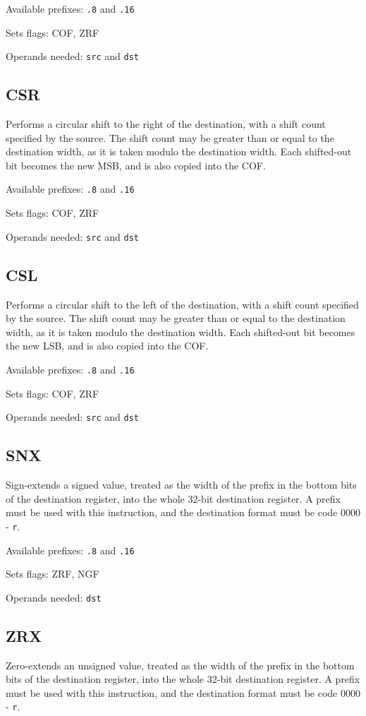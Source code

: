 \documentclass[12pt,a4paper]{report}
\begin{document}
Available prefixes: \texttt{.8} and \texttt{.16}

Sets flags: COF, ZRF

Operands needed: \texttt{src} and \texttt{dst}

\subsection*{CSR}
Performs a circular shift to the right of the destination, with a shift count specified by the source. The shift count may be greater than or equal to the destination width, as it is taken modulo the destination width. Each shifted-out bit becomes the new MSB, and is also copied into the COF.

Available prefixes: \texttt{.8} and \texttt{.16}

Sets flags: COF, ZRF

Operands needed: \texttt{src} and \texttt{dst}

\subsection*{CSL}
Performs a circular shift to the left of the destination, with a shift count specified by the source. The shift count may be greater than or equal to the destination width, as it is taken modulo the destination width. Each shifted-out bit becomes the new LSB, and is also copied into the COF.

Available prefixes: \texttt{.8} and \texttt{.16}

Sets flags: COF, ZRF

Operands needed: \texttt{src} and \texttt{dst}

\subsection*{SNX} \label{signex}
Sign-extends a signed value, treated as the width of the prefix in the bottom bits of the destination register, into the whole 32-bit destination register. A prefix must be used with this instruction, and the destination format must be code 0000 - \texttt{r}.

Available prefixes: \texttt{.8} and \texttt{.16}

Sets flags: ZRF, NGF

Operands needed: \texttt{dst}

\subsection*{ZRX}
Zero-extends an unsigned value, treated as the width of the prefix in the bottom bits of the destination register, into the whole 32-bit destination register. A prefix must be used with this instruction, and the destination format must be code 0000 - \texttt{r}.
\end{document}
